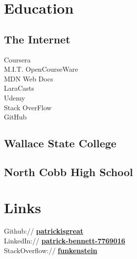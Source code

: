 \documentclass[]{pb-resume-openfonts}
\begin{document}
%
%
\lastupdated

%
%

%
%

\begin{minipage}[t]{0.33\textwidth} 


\section{Education} 

\subsection{The Internet}
Coursera \\
M.I.T. OpenCourseWare \\
MDN Web Docs \\
LaraCasts \\
Udemy \\
Stack OverFlow \\
GitHub \\

\sectionsep

\subsection{Wallace State College}
\sectionsep

\subsection{North Cobb High School}
\sectionsep


\section{Links} 
Github:// \href{https://github.com/patrickisgreat}{\bf patrickisgreat} \\
LinkedIn://  \href{https://www.linkedin.com/in/patrick-bennett-7769016}{\bf patrick-bennett-7769016} \\
StackOverflow:// \href{https://stackoverflow.com/users/864159/funkenstein}{\bf funkenstein} \\



\end{minipage}
\end{document}
